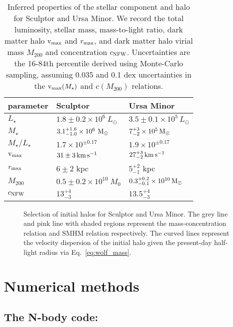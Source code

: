 \begin{table*}[t]
\centering
\caption[Derived Properties of Sculptor and Ursa Minor]{Inferred properties of the stellar component and halo for Sculptor and Ursa Minor. We record the total luminosity, stellar mass, mass-to-light ratio, dark matter halo ${\rm v}_{\rm max}$ and $r_{\rm max}$, and dark matter halo virial mass $M_{200}$ and concentration $c_{\rm NFW}$. Uncertainties are the 16-84th percentile derived using Monte-Carlo sampling, assuming 0.035 and 0.1 dex uncertainties in the ${\rm v}_{\rm max}(M_\star)$ and $c(M_{200})$ relations. }
\label{tbl:derived_props}
\begin{tabular}{lll}
\toprule
parameter & Sculptor & Ursa Minor\\
\midrule
$L_\star$ & $1.8\pm0.2\times10^6\ L_\odot$ & $3.5 \pm 0.1 \times 10^5\,L_\odot$\\
$M_\star$ & $3.1_{-1.0}^{+1.6} \times10^6\ {\rm M}_\odot$ & $7_{-2}^{+3} \times 10^5\,{\rm M}_{\odot}$\\
$M_\star / L_\star$ & $1.7\times 10^{\pm 0.17}$ & $1.9 \times 10^{\pm 0.17}$\\
${\rm v}_{\rm max}$ & $31\pm 3\,{\rm km\,s^{-1}}$ & $27_{-2}^{+3}\,{\rm km\,s^{-1}}$\\
$r_{\rm max}$ & $6 \pm 2$ kpc & $5_{-1}^{+2}$ kpc\\
$M_{200}$ & $0.5 \pm 0.2\times10^{10}\ M_0$ & $0.3_{-0.1}^{+0.2} \times 10^{10}\,{\rm M}_{\odot}$\\
$c_{\rm NFW}$ & $13_{-3}^{+4}$ & $13.5_{-3}^{+4}$\\
\bottomrule
\end{tabular}
\end{table*}

\begin{figure}
\centering
{}
\caption[Initial halo selection]{Selection of initial halos for Sculptor
and Ursa Minor. The grey line and pink line with shaded regions
represent the \citet{ludlow+2016} mass-concentration relation and
\citet{fattahi+2018} SMHM relation respectively. The curved lines
represent the velocity dispersion of the initial halo given the
present-day half-light radius via
Eq.~\ref{eq:wolf_mass}.}\label{fig:scl_halos}
\end{figure}

\section{Numerical methods}\label{numerical-methods}

\subsection{\texorpdfstring{The N-body code:
\gadget{}}{The N-body code: }}\label{the-n-body-code}

